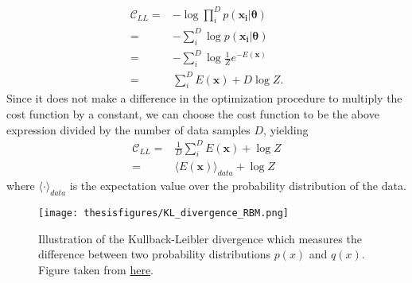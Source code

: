 \documentclass[twoside,english]{uiofysmaster}
\newcommand*\dif{\mathop{}\!\mathrm{d}}
\begin{document}
\begin{comment}
\begin{align}
	\mathcal{C}_{LL} =& - \log \prod_i^D p(\bm{x_i} | \bm{\theta})  \\
	=& - \sum_i^D \log  p(\bm{x_i} | \bm{\theta})  \\
	=& - \sum_i^D \log \int p(\bm{x_i}, \bm{h} | \bm{\theta}) \dif \bm{h} \\
	=& - \sum_i^D \log \int \frac{1}{Z} e^{- E(\bm{x_i}, \bm{h})} \dif \bm{h} \\
	=& - \sum_i^D \log \int e^{- E(\bm{x_i}, \bm{h})} \dif \bm{h} + D \log Z . \\
\end{align}
\end{comment}


\begin{align}
	\mathcal{C}_{LL} =& - \log \prod_i^D p(\bm{x_i} | \bm{\theta})  \\
	=& - \sum_i^D \log  p(\bm{x_i} | \bm{\theta})  \\
	=& - \sum_i^D \log \frac{1}{Z} e^{-E(\bm{x})} \\
	=& \sum_i^D E(\bm{x}) + D \log Z .
\end{align}
Since it does not make a difference in the optimization procedure to multiply the cost function by a constant, we can choose the cost function to be the above expression divided by the number of data samples $D$, yielding
\begin{align}
	\mathcal{C}_{LL} =& \frac{1}{D}\sum_i^D E(\bm{x}) + \log Z \\
	=& \langle E(\bm{x}) \rangle_{data} + \log Z
\end{align}
where $\langle \cdot \rangle_{data}$ is the expectation value over the probability distribution of the data. 


\begin{figure}
\centering
 \texttt{[image: thesisfigures/KL\_divergence\_RBM.png]}
 \caption{Illustration of the Kullback-Leibler divergence which measures the difference between two probability distributions $p(x)$ and $q(x)$.
 Figure taken from \href{https://deeplearning4j.org/restrictedboltzmannmachine}{here}.}
 \label{fig:KLdivergence}
\end{figure}
\end{document}
